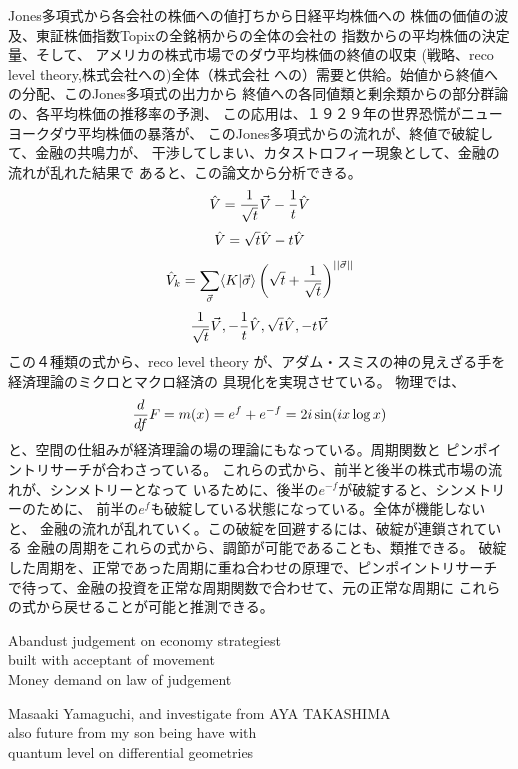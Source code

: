 \documentclass{jsarticle}
\begin{document}
{   Jones多項式から各会社の株価への値打ちから日経平均株価への
   株価の価値の波及、東証株価指数Topixの全銘柄からの全体の会社の
   指数からの平均株価の決定量、そして、
   アメリカの株式市場でのダウ平均株価の終値の収束
   (戦略、reco level theory,株式会社への)全体（株式会社
   への）需要と供給。始値から終値への分配、このJones多項式の出力から
   終値への各同値類と剰余類からの部分群論の、各平均株価の推移率の予測、
   この応用は、１９２９年の世界恐慌がニューヨークダウ平均株価の暴落が、
   このJones多項式からの流れが、終値で破綻して、金融の共鳴力が、
   干渉してしまい、カタストロフィー現象として、金融の流れが乱れた結果で
   あると、この論文から分析できる。
   $$ \Hat{V} = {1 \over \sqrt{t}} \vec{V} - {1 \over t}\Hat{V} $$
   $$ \Hat{V} = \sqrt{t}\Hat{V} - t \Hat{V} $$
   $$ \Hat{V}_k = \sum_{\vec{\sigma}} \langle K| \vec{\sigma}\rangle
   \left(\sqrt{t} + {1 \over \sqrt{t}} \right)^{||\vec{\sigma}||} $$
   $$ {1 \over \sqrt{t}}\vec{V}, -{1 \over t}\Hat{V},\\ 
   \sqrt{t}\Hat{V}, -t \vec{V} $$
   この４種類の式から、reco level theory
   が、アダム・スミスの神の見えざる手を経済理論のミクロとマクロ経済の
   具現化を実現させている。
   物理では、$$ {d \over df}F = m(x) = e^f + e^{-f} = 2 i \sin (i x \log x) $$
   と、空間の仕組みが経済理論の場の理論にもなっている。周期関数と
   ピンポイントリサーチが合わさっている。
   これらの式から、前半と後半の株式市場の流れが、シンメトリーとなって
   いるために、後半の$ e^{-f} $が破綻すると、シンメトリーのために、
   前半の$ e^f $も破綻している状態になっている。全体が機能しないと、
   金融の流れが乱れていく。この破綻を回避するには、破綻が連鎖されている
   金融の周期をこれらの式から、調節が可能であることも、類推できる。
   破綻した周期を、正常であった周期に重ね合わせの原理で、ピンポイントリサーチ
   で待って、金融の投資を正常な周期関数で合わせて、元の正常な周期に
   これらの式から戻せることが可能と推測できる。

\newpage
\begin{center}
\large	Abandust judgement on economy strategiest \\
built with acceptant of movement \\
Money demand on law of judgement
\end{center}
\begin{center}
	Masaaki Yamaguchi, and investigate from AYA TAKASHIMA \\
also future from my son being have with \\
quantum level on differential geometries
\end{center}



}
\end{document}
